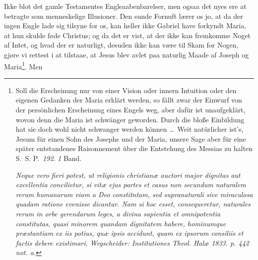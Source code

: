 \documentclass[12pt]{book}
\newcommand{\opage}[1]{\marginnote{\footnotesize\textit{[#1]}}}
\begin{document}
\opage{94} \setcounter{footnote}{0}%
Ikke blot det gamle Testamentes Engleaabenbarelser, men ogsaa det nyes ere at
betragte som menneskelige Illusioner. Den sunde Fornuft lærer os jo, at da der
ingen Engle lade sig tilsyne for os, kan heller ikke Gabriel have forkyndt
Maria, at hun skulde føde Christus; og da det er vist, at der ikke kan
fremkomme Noget af Intet, og hvad der er naturligt, desuden ikke kan være til
Skam for Nogen, gjøre vi rettest i at tilstaae, at Jesus blev avlet paa
naturlig Maade af Joseph og Maria\footnote{Soll die Erscheinung nur von einer
Vision oder innern Intuition oder den eigenen Gedanken der Maria erklärt
werden, so fällt zwar der Einwurf von der persönlichen Erscheinung eines Engels
weg, aber dafür ist unaufgeklärt, wovon denn die Maria ist schwänger geworden.
Durch die bloße Einbildung hat sie doch wohl nicht schwanger werden können
\ldots\ Weit natürlicher ist's, Jesum für einen Sohn des Josephs und der Maria,
unsere Sage aber für eine später entstandenes Raisonnement über die Entstehung
des Messias zu halten S.~S. P.~\textit{192}. \textit{1} Band.\par
\textit{Neque vero fieri potest, ut religionis christianæ auctori major dignitas
aut excellentia concilietur, si vitæ ejus partes et casus non secundum
naturalem rerum humanarum viam a Deo constitntam, sed supranaturali sive
miraculosa quadam ratione evenisse dicantur. Nam si hoc esset, consequeretur,
naturales rerum in orbe gerendarum leges, a divina sapientia et omnipotentia
constitutas, quasi minorem quandam dignitatem habere, hominumque præstantiam ex
iis potius, quæ ipsis accidunt, quam ex ipsorum consiliis et factis debere
existimari. Wegscheider: Institutiones Theol. Halæ 1833. p. 442 not. a.}}. Men
\end{document}

